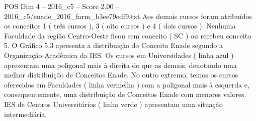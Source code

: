 \begin{textsample}{POS Dim 4 – 2016\_c5 – Score 2.00 – 2016\_c5/enade\_2016\_farm\_b3ee79edf9.txt}
Aos demais cursos foram atribuídos os conceitos 1 ( três cursos ), 3 ( oito cursos ) e 4 ( dois cursos ).
Nenhuma Faculdade da região Centro-Oeste ficou sem conceito ( SC ) ou recebeu conceito 5.
O Gráfico 5.3 apresenta a distribuição do Conceito Enade segundo a Organização Acadêmica da IES.
Os cursos em Universidades ( linha azul ) apresentam uma poligonal mais à direita do que as demais, denotando uma melhor distribuição de Conceitos Enade.
No outro extremo, temos os cursos oferecidos em Faculdades ( linha vermelha ) com a poligonal mais à esquerda e, consequentemente, uma distribuição de Conceitos Enade com menores valores.
IES de Centros Universitários ( linha verde ) apresentam uma situação intermediária.

\end{textsample}
